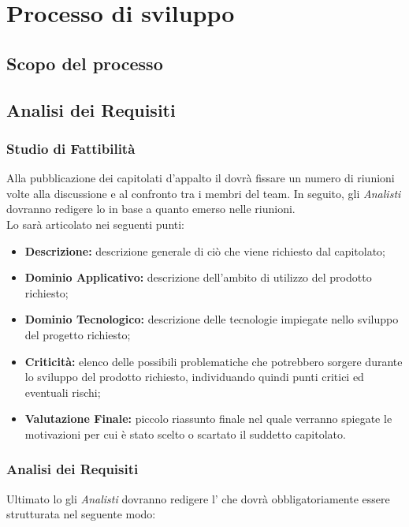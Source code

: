 \section{Processo di sviluppo}

\subsection{Scopo del processo}

\subsection{Analisi dei Requisiti}
\subsubsection{Studio di Fattibilità}
Alla pubblicazione dei capitolati d'appalto il \textsl{\RdP} dovrà fissare un 
numero di riunioni volte alla discussione e al confronto tra i membri del team. 
In seguito, gli \textsl{Analisti} dovranno redigere lo \textsl{\SdF} in base a quanto 
emerso nelle riunioni.\\
Lo \textsl{\SdF} sarà articolato nei seguenti punti:
\begin{itemize}
  \item \textbf{Descrizione:} descrizione generale di ciò che viene richiesto 
  dal capitolato;
  \item \textbf{Dominio Applicativo:} descrizione dell'ambito di utilizzo del 
  prodotto richiesto;
  \item \textbf{Dominio Tecnologico:} descrizione delle tecnologie impiegate 
  nello sviluppo del progetto richiesto;
  \item \textbf{Criticità:} elenco delle possibili problematiche che potrebbero 
  sorgere durante lo sviluppo del prodotto richiesto, individuando quindi punti 
  critici ed eventuali rischi;
  \item \textbf{Valutazione Finale:} piccolo riassunto finale nel quale verranno 
  spiegate le motivazioni per cui è stato scelto o scartato il suddetto 
  capitolato.
\end{itemize}

\subsubsection{Analisi dei Requisiti}
Ultimato lo \textsl{\SdF} gli \textsl{Analisti} dovranno redigere l'\textsl{\AdR} 
che dovrà obbligatoriamente essere strutturata nel seguente modo:

